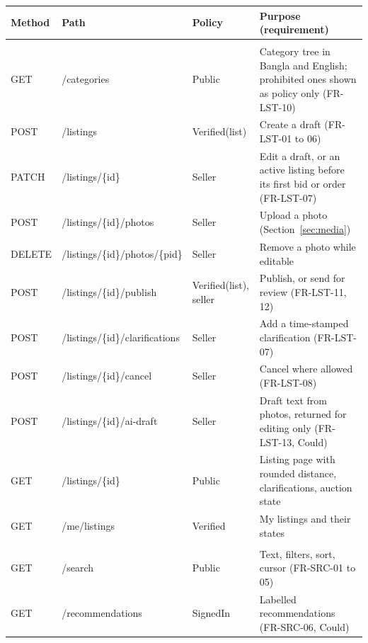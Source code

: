 \documentclass[11pt,a4paper]{article}
\begin{document}
{\small
\begin{longtable}{@{}>{\ttfamily\raggedright\arraybackslash}p{1.15cm}>{\ttfamily\raggedright\arraybackslash}p{4.6cm}>{\raggedright\arraybackslash}p{2.7cm}>{\raggedright\arraybackslash}p{6.5cm}@{}}
\toprule
\textnormal{\textbf{Method}} & \textnormal{\textbf{Path}} & \textbf{Policy} & \textbf{Purpose (requirement)} \\ \midrule \endhead
\multicolumn{4}{@{}l}{\textbf{Listings}} \\
GET & /\allowbreak categories & Public & Category tree in Bangla and English; prohibited ones shown as policy only (FR-LST-10) \\
POST & /\allowbreak listings & Verified(list) & Create a draft (FR-LST-01 to 06) \\
PATCH & /\allowbreak listings/\allowbreak \{id\} & Seller & Edit a draft, or an active listing before its first bid or order (FR-LST-07) \\
POST & /\allowbreak listings/\allowbreak \{id\}/\allowbreak photos & Seller & Upload a photo (Section~\ref{sec:media}) \\
DELETE & /\allowbreak listings/\allowbreak \{id\}/\allowbreak photos/\allowbreak \{pid\} & Seller & Remove a photo while editable \\
POST & /\allowbreak listings/\allowbreak \{id\}/\allowbreak publish & Verified(list), seller & Publish, or send for review (FR-LST-11, 12) \\
POST & /\allowbreak listings/\allowbreak \{id\}/\allowbreak clarifications & Seller & Add a time-stamped clarification (FR-LST-07) \\
POST & /\allowbreak listings/\allowbreak \{id\}/\allowbreak cancel & Seller & Cancel where allowed (FR-LST-08) \\
POST & /\allowbreak listings/\allowbreak \{id\}/\allowbreak ai-\allowbreak draft & Seller & Draft text from photos, returned for editing only (FR-LST-13, Could) \\
GET & /\allowbreak listings/\allowbreak \{id\} & Public & Listing page with rounded distance, clarifications, auction state \\
GET & /\allowbreak me/\allowbreak listings & Verified & My listings and their states \\
\multicolumn{4}{@{}l}{\textbf{Search}} \\
GET & /\allowbreak search & Public & Text, filters, sort, cursor (FR-SRC-01 to 05) \\
GET & /\allowbreak recommendations & SignedIn & Labelled recommendations (FR-SRC-06, Could) \\

\end{longtable}}
\end{document}
